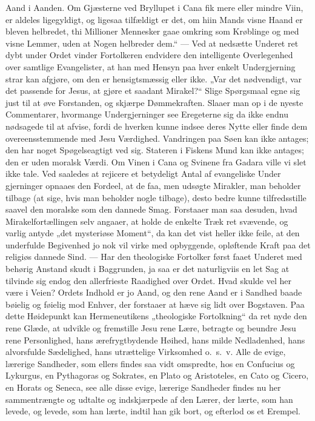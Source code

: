 \documentclass[12pt,a4paper]{book}
\begin{document}
Aand i Aanden. Om Gjæsterne ved Bryllupet i Cana fik mere eller mindre Viin, er aldeles
ligegyldigt, og ligesaa tilfældigt er det,
om hiin Mands visne Haand er bleven helbredet, thi Millioner Mennesker gaae omkring som
Krøblinge og med visne Lemmer, uden at Nogen helbreder dem.“ --- Ved at nedsætte Underet ret
dybt under Ordet vinder Fortolkeren endvidere den intelligente Overlegenhed over samtlige
Evangelister, at han med Hensyn paa hver enkelt Undergjerning strar kan afgjøre, om den er
hensigtsmæssig eller ikke. „Var det nødvendigt, var det passende for Jesus, at gjøre et
saadant Mirakel?“ Slige Spørgsmaal egne sig just til at øve Forstanden, og skjærpe
Dømmekraften. Slaaer man op i de nyeste Commentarer, hvormange Undergjerninger see Eregeterne
sig da ikke endnu nødsagede til at afvise, fordi de hverken kunne indsee deres Nytte eller
finde dem overeensstemmende med Jesu Værdighed. Vandringen paa Søen kan ikke antages; den har
noget Spøgelseagtigt ved sig. Stateren i Fiskens Mund kan ikke antages; den er uden moralsk
Værdi. Om Vinen i Cana og Svinene fra Gadara ville vi slet ikke tale. Ved saaledes at
rejicere et betydeligt Antal af evangeliske Under\-%
gjerninger opnaaes den Fordeel, at de faa, men udsøgte Mirakler, man beholder tilbage (at
sige, hvis man beholder nogle tilbage), desto bedre kunne tilfredsstille saavel den moralske
som den dannede Smag. Forstaaer man saa desuden, hvad Mirakelfortællingen selv angaaer, at
holde de enkelte Træk ret svævende, og varlig antyde „det mysteriøse Moment“, da kan det vist
heller ikke feile, at den underfulde Begivenhed jo nok vil virke med opbyggende, opløftende
Kraft paa det religiøs dannede Sind. --- Har den theologiske Fortolker først faaet Underet
med behørig Anstand skudt i Baggrunden, ja saa er det naturligviis en let Sag at tilvinde sig
endog den allerfrieste Raadighed over Ordet. Hvad skulde vel her være i Veien? Ordets Indhold
er jo Aand, og den rene Aand er i Sandhed baade bøielig og føielig mod Enhver, der forstaaer
at hæve sig lidt over Bogstaven. Paa dette Høidepunkt kan Hermeneutikens „theologiske
Fortolkning“ da ret nyde den rene Glæde, at udvikle og fremstille Jesu rene Lære, betragte og
beundre Jesu rene Personlighed, hans ærefrygtbydende Høihed, hans milde Nedladenhed, hans
alvorsfulde Sædelighed, hans utrættelige Virksomhed o.\ s.\ v. Alle de evige, lærerige
Sandheder, som ellers findes saa vidt omspredte, hos en Confucius og Lykurgus, en Pythagoras
og Sokrates, en Plato og Aristoteles, en Cato og Cicero, en Horats og Seneca, see alle disse
evige, lærerige Sandheder findes nu her sammentrængte og udtalte og indskjærpede af den
Lærer, der lærte, som han levede, og levede, som han lærte, indtil han gik bort, og efterlod
os et Erempel.
\end{document}
